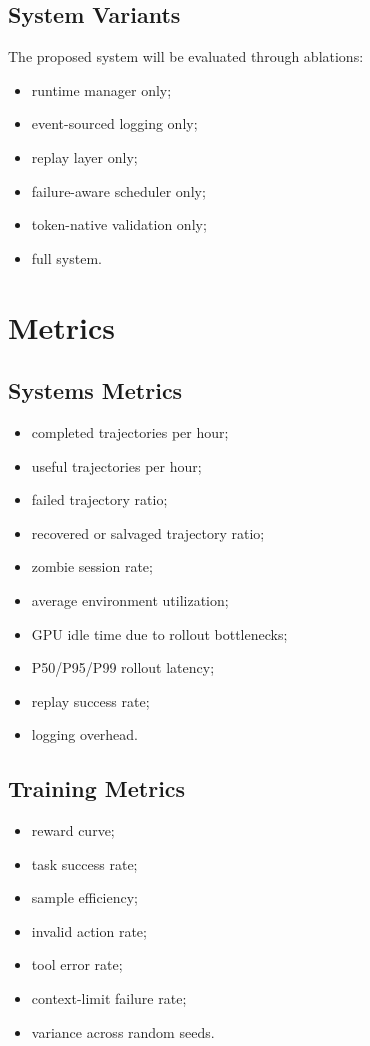 \documentclass[11pt]{article}
\begin{document}
\subsection{System Variants}

The proposed system will be evaluated through ablations:

\begin{itemize}[leftmargin=*]
    \item runtime manager only;
    \item event-sourced logging only;
    \item replay layer only;
    \item failure-aware scheduler only;
    \item token-native validation only;
    \item full system.
\end{itemize}

\section{Metrics}

\subsection{Systems Metrics}

\begin{itemize}[leftmargin=*]
    \item completed trajectories per hour;
    \item useful trajectories per hour;
    \item failed trajectory ratio;
    \item recovered or salvaged trajectory ratio;
    \item zombie session rate;
    \item average environment utilization;
    \item GPU idle time due to rollout bottlenecks;
    \item P50/P95/P99 rollout latency;
    \item replay success rate;
    \item logging overhead.
\end{itemize}

\subsection{Training Metrics}

\begin{itemize}[leftmargin=*]
    \item reward curve;
    \item task success rate;
    \item sample efficiency;
    \item invalid action rate;
    \item tool error rate;
    \item context-limit failure rate;
    \item variance across random seeds.
\end{itemize}
\end{document}
